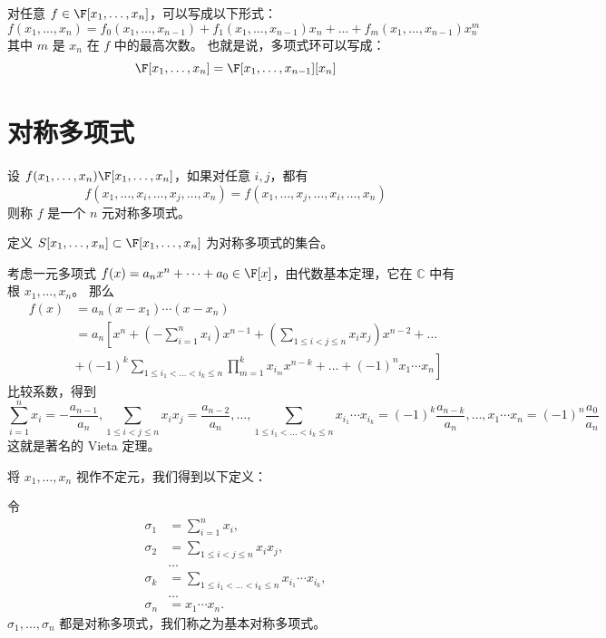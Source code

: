 对任意 \( f \in \F[x_1,\dots,x_n] \)，可以写成以下形式：
\[
f(x_1,\dots,x_n) = f_0(x_1,\dots,x_{n-1}) + f_1(x_1,\dots,x_{n-1})x_n + \dots + f_m(x_1,\dots,x_{n-1})x_n^m
\]
其中 \( m \) 是 \( x_n \) 在 \( f \) 中的最高次数。
也就是说，多项式环可以写成：
\[
\F[x_1,\dots,x_n] = \F[x_1,\dots,x_{n-1}][x_n]
\]
\section{对称多项式}
\begin{definition}
	设 \( f(x_1,\dots,x_n) \F[x_1,\dots,x_n] \)，如果对任意 \( i,j \)，都有
	\[
	f(x_1,\dots,x_i,\dots,x_j,\dots,x_n) = f(x_1,\dots,x_j,\dots,x_i,\dots,x_n)
	\]
	则称 \( f \) 是一个 \( n \) 元对称多项式。
	
	定义 \( S[x_1,\dots,x_n] \subset \F[x_1,\dots,x_n] \) 为对称多项式的集合。
\end{definition}


考虑一元多项式 \( f(x)=a_nx^n+\dots+a_0 \in \F[x] \)，由代数基本定理，它在 \( \mathbb{C} \) 中有根 \( x_1,\dots,x_n \)。
那么
\[
\begin{aligned}
	f(x) &= a_n(x-x_1)\cdots(x-x_n) \\
	&= a_n\left[ x^n + \left(-\sum_{i=1}^n x_i\right)x^{n-1} + \left(\sum_{1\le i<j\le n} x_i x_j\right)x^{n-2} + \dots \right. \\
	& \left. + (-1)^k \sum_{1\le i_1<\dots<i_k\le n} \prod_{m=1}^k x_{i_m} x^{n-k} + \dots + (-1)^n x_1\cdots x_n \right]
\end{aligned}
\]
比较系数，得到
\[
\sum_{i=1}^n x_i = -\frac{a_{n-1}}{a_n}
,\sum_{1\le i<j\le n} x_i x_j = \frac{a_{n-2}}{a_n},
\dots,
\sum_{1\le i_1<\dots<i_k\le n} x_{i_1}\cdots x_{i_k} = (-1)^k\frac{a_{n-k}}{a_n},
\dots,
x_1\cdots x_n = (-1)^n\frac{a_0}{a_n}
\]
这就是著名的 Vieta 定理。

将 \( x_1,\dots,x_n \) 视作不定元，我们得到以下定义：

\begin{definition}
	令
	\[
	\begin{aligned}
		\sigma_1 &= \sum_{i=1}^n x_i, \\
		\sigma_2 &= \sum_{1\le i<j\le n} x_i x_j, \\
		&\dots \\
		\sigma_k &= \sum_{1\le i_1<\dots<i_k\le n} x_{i_1}\cdots x_{i_k}, \\
		&\dots \\
		\sigma_n &= x_1\cdots x_n.
	\end{aligned}
	\]
	\( \sigma_1,\dots,\sigma_n \) 都是对称多项式，我们称之为基本对称多项式。
\end{definition}

